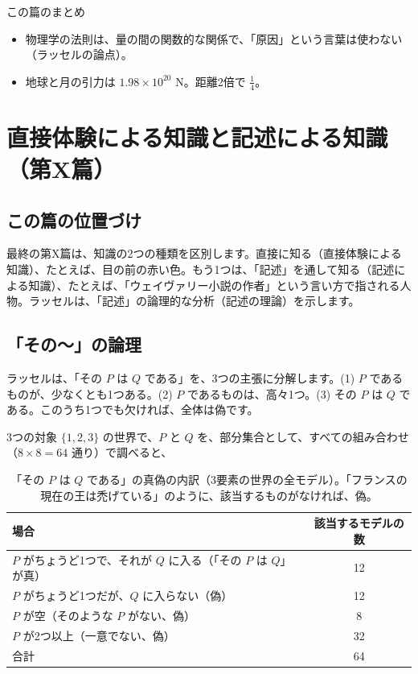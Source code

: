 \documentclass[a4paper,11pt,openany]{ltjsbook}
\begin{document}
\begin{pointbox}{この篇のまとめ}
\begin{itemize}[leftmargin=*]
\item 物理学の法則は、量の間の関数的な関係で、「原因」という言葉は使わない（ラッセルの論点）。
\item 地球と月の引力は $1.98\times10^{20}$ N。距離2倍で $\tfrac14$。
\end{itemize}
\end{pointbox}

\chapter{直接体験による知識と記述による知識（第X篇）}

\section{この篇の位置づけ}

最終の第X篇は、知識の2つの種類を区別します。直接に知る（直接体験による知識）、たとえば、目の前の赤い色。もう1つは、「記述」を通して知る（記述による知識）、たとえば、「ウェイヴァリー小説の作者」という言い方で指される人物。ラッセルは、「記述」の論理的な分析（記述の理論）を示します。

\section{「その〜」の論理}

ラッセルは、「その $P$ は $Q$ である」を、3つの主張に分解します。(1) $P$ であるものが、少なくとも1つある。(2) $P$ であるものは、高々1つ。(3) その $P$ は $Q$ である。このうち1つでも欠ければ、全体は偽です。

3つの対象 $\{1,2,3\}$ の世界で、$P$ と $Q$ を、部分集合として、すべての組み合わせ（$8\times8=64$ 通り）で調べると、

\begin{table}[htbp]
\centering
\begin{tabular}{lc}
\toprule
場合 & 該当するモデルの数\\
\midrule
$P$ がちょうど1つで、それが $Q$ に入る（「その $P$ は $Q$」が真） & 12\\
$P$ がちょうど1つだが、$Q$ に入らない（偽） & 12\\
$P$ が空（そのような $P$ がない、偽） & 8\\
$P$ が2つ以上（一意でない、偽） & 32\\
\midrule
合計 & 64\\
\bottomrule
\end{tabular}
\caption{「その $P$ は $Q$ である」の真偽の内訳（3要素の世界の全モデル）。「フランスの現在の王は禿げている」のように、該当するものがなければ、偽。}
\end{table}
\end{document}
